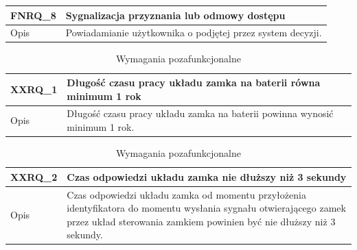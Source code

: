 \begin{table}[h!]
\begin{subtable}[c]{\textwidth}
\begin{tabular}{p{2cm}|p{12cm}}
                    \end{tabular}
                \label{tbl:fnrq7}
                \vspace{10mm}           
            \end{subtable}
        \quad%
            \begin{subtable}[c]{\textwidth}
                \centering
                 \begin{tabular}{p{2cm}|p{12cm}}
                    FNRQ\_8      & \textbf{Sygnalizacja przyznania lub odmowy dostępu}  \\
                    \hline Opis         & Powiadamianie użytkownika o podjętej przez system decyzji. \\
                \end{tabular}
                \label{tbl:fnrq8}
                \vspace{10mm}           
            \end{subtable}
            \label{tbl:fnrq}
        \end{table}

        \begin{table}[h!]
            \caption{Wymagania pozafunkcjonalne}
            \centering
            \begin{subtable}[c]{\textwidth}
                \centering
                \begin{tabular}{p{2cm}|p{12cm}}
                     XXRQ\_1      & \textbf{Długość czasu pracy układu zamka na baterii równa minimum 1 rok}  \\
                    \hline Opis         & Długość czasu pracy układu zamka na baterii powinna wynosić minimum 1 rok. \\
                \end{tabular}
                \label{tbl:xxrq1}
                \vspace{10mm}       
            \end{subtable}
        \quad%
            \begin{subtable}[c]{\textwidth}
                \centering
                \begin{tabular}{p{2cm}|p{12cm}}
                    XXRQ\_2      & \textbf{Czas odpowiedzi układu zamka nie dłuższy niż 3 sekundy}  \\
                    \hline Opis         & Czas odpowiedzi układu zamka od momentu przyłożenia identyfikatora do momentu wysłania sygnału otwierającego zamek przez układ sterowania zamkiem powinien być nie dłuższy niż 3 sekundy. \\
                \end{tabular}
                \label{tbl:xxrq2}    
            \end{subtable}
            \label{tbl:xxrq}
        \end{table}

